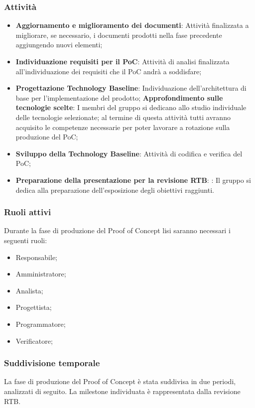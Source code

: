 \subsubsection{Attività}
\begin{itemize}
	\item \textbf{Aggiornamento e miglioramento dei documenti}: Attività finalizzata a migliorare, se necessario, i documenti prodotti nella fase precedente aggiungendo nuovi elementi;
	\item \textbf{Individuazione requisiti per il PoC}: Attività di analisi finalizzata all’individuazione dei requisiti che il PoC andrà a soddisfare;
    \item \textbf{Progettazione Technology Baseline}: Individuazione dell’architettura di base per l’implementazione del prodotto;
        \subitem \textbf{Approfondimento sulle tecnologie scelte}: I membri del gruppo si dedicano allo studio individuale delle tecnologie selezionate; al termine di questa attività tutti avranno acquisito le competenze necessarie per poter lavorare a rotazione sulla produzione del PoC;
    \item \textbf{Sviluppo della Technology Baseline}: Attività di codifica e verifica del PoC;
    \item \textbf{Preparazione della presentazione per la revisione RTB}: : Il gruppo si dedica alla preparazione dell’esposizione degli obiettivi raggiunti.
\end{itemize}

\subsubsection{Ruoli attivi}
Durante la fase di produzione del Proof of Concept lisi saranno necessari i seguenti ruoli:
\begin{itemize}
	\item Responsabile;
    \item Amministratore;
    \item Analista;
    \item Progettista;
    \item Programmatore;
    \item Verificatore;
\end{itemize}

\subsubsection{Suddivisione temporale}
La fase di produzione del Proof of Concept è stata suddivisa in due periodi, analizzati di seguito. La milestone individuata è rappresentata dalla revisione RTB.

